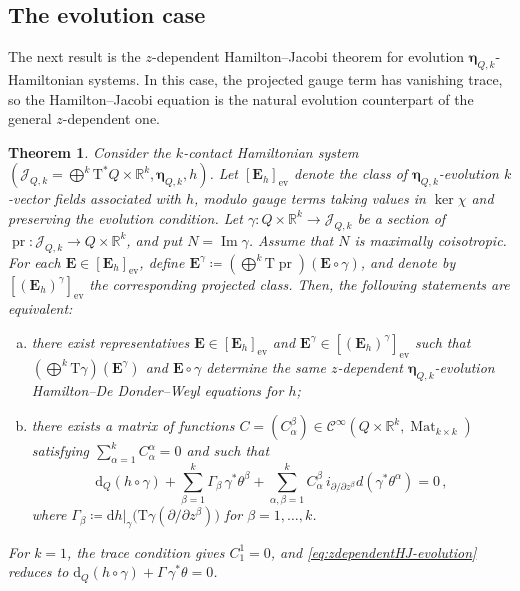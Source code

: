 \documentclass[11pt,twoside]{article}
\theoremstyle{plain}
\newtheorem{theorem}{Theorem}[section]
\theoremstyle{definition}
\theoremstyle{remark}
\newcommand{\dd}{\mathrm{d}}
\renewcommand{\d}{\mathrm{d}}
\newcommand{\Cinfty}{\mathscr{C}^\infty}
\newcommand{\T}{\mathrm{T}}
\newcommand\restr[2]{\left.#1\right|_{#2}} \newcommand{\bfX}{\mathbf{X}} \newcommand{\bfY}{\mathbf{Y}} \newcommand{\bfZ}{\mathbf{Z}} \newcommand{\qeddiamond}{\hfill $\diamond$} \newcommand{\parder}[2]{\frac{\partial #1}{\partial #2}} \newcommand{\dparder}[2]{\dfrac{\partial #1}{\partial #2}} \newcommand{\tparder}[2]{\partial #1/\partial #2} \newcommand{\parderr}[3]{\frac{\partial^2 #1}{\partial #2\partial #3}} \newcommand{\dparderr}[3]{\dfrac{\partial^2 #1}{\partial #2\partial #3}} \newcommand{\tparderr}[3]{\partial^2 #1/\partial #2\partial #3}
\begin{document}
\subsection{The evolution case}
\label{sec:HJzdepEvolution}


The next result is the $z$-dependent Hamilton--Jacobi theorem for evolution $\bm\eta_{Q,k}$-Hamiltonian systems. In this case, the projected gauge term has vanishing trace, so the Hamilton--Jacobi equation is the natural evolution counterpart of the general $z$-dependent one.
\begin{theorem}\label{thm:zdependentHJ-evolution}
Consider the $k$-contact Hamiltonian system 
$(\mathcal J_{Q,k}=\bigoplus^k \T^*Q\times\mathbb R^k,\bm\eta_{Q,k},h)$.
Let $[\mathbf E_h]_{\mathrm{ev}}$ denote the class of  $\bm \eta_{Q,k}$-evolution
  $k$-vector fields associated with $h$, modulo gauge terms
taking values in $\ker\chi$ and preserving the evolution condition. Let
$\gamma\colon Q\times\mathbb R^k\to \mathcal J_{Q,k}$ be a section of
$\operatorname{pr}\colon \mathcal J_{Q,k}\to Q\times\mathbb R^k$, and put
$N=\operatorname{Im}\gamma$. Assume that $N$ is maximally coisotropic. For each
$\mathbf E\in [\mathbf E_h]_{\mathrm{ev}}$, define
$\mathbf E^\gamma\coloneqq(\bigoplus^k \T\operatorname{pr})(\mathbf E\circ\gamma)$, and denote
by $[(\mathbf E_h)^\gamma]_{\mathrm{ev}}$ the corresponding projected class. Then, the
following statements are equivalent:

\begin{enumerate}[(a)]
\item there exist representatives $\mathbf E\in [\mathbf E_h]_{\mathrm{ev}}$ and
$\mathbf E^\gamma\in [(\mathbf E_h)^\gamma]_{\mathrm{ev}}$ such that
$(\bigoplus^k \T\gamma)(\mathbf E^\gamma)$ and $\mathbf E\circ\gamma$ determine the same
$z$-dependent $\bm\eta_{Q,k}$-evolution Hamilton--De Donder--Weyl equations for $h$;

\item there exists a matrix of  functions
$C=(C^\beta_{\alpha})\in \Cinfty(Q\times\mathbb R^k,\operatorname{Mat}_{k\times k})$
satisfying $\sum_{\alpha=1}^k C^\alpha_{\alpha}=0$ and such that
\begin{equation}\label{eq:zdependentHJ-evolution}
{ \dd_Q(h\circ\gamma)}+\sum_{\beta=1}^k \Gamma_\beta\,\gamma^*\theta^\beta
+\sum_{\alpha,\beta=1}^k C^\beta_{\alpha}\,
i_{\partial/\partial z^\beta}d(\gamma^*\theta^\alpha)=0\,,
\end{equation}
where 
$\Gamma_\beta\coloneqq \restr{\d h}{\gamma}\bigl(\T\gamma(\partial/\partial z^\beta)\bigr)$ for
$\beta=1,\dots,k$.
\end{enumerate}
For $k=1$, the trace condition gives $C^1_1=0$, and
\eqref{eq:zdependentHJ-evolution} reduces to
$\dd_Q(h\circ\gamma)+\Gamma\,\gamma^*\theta=0$.
\end{theorem}
\end{document}
